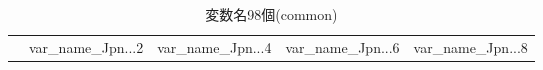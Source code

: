 \begin{table}[ht]
\centering
\caption{変数名98個(common)}
\label{table_commom_d.tex}
\begingroup\tiny

\begin{adjustbox}{width=.5\textwidth}
\begin{tabular}{rllll}
  \hline
 & var\_name\_Jpn...2 & var\_name\_Jpn...4 & var\_name\_Jpn...6 & var\_name\_Jpn...8 \\
\end{tabular}
\end{adjustbox}

\endgroup
\end{table}

